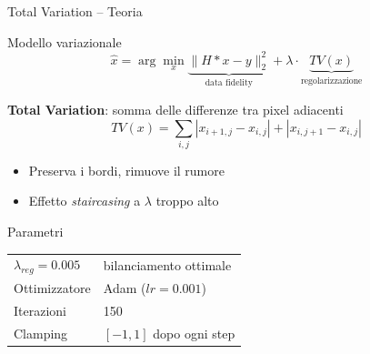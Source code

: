 \documentclass[italian,10pt]{beamer}
\begin{document}
\begin{frame}{Total Variation -- Teoria}
  \begin{block}{Modello variazionale}
    \begin{equation*}
      \hat{x} = \arg\min_x \underbrace{\|H*x - y\|_2^2}_{\text{data fidelity}} + \lambda \cdot \underbrace{TV(x)}_{\text{regolarizzazione}}
    \end{equation*}
  \end{block}
  \vspace{0.2cm}
  \textbf{Total Variation}: somma delle differenze tra pixel adiacenti
  \begin{equation*}
    TV(x) = \sum_{i,j} |x_{i+1,j} - x_{i,j}| + |x_{i,j+1} - x_{i,j}|
  \end{equation*}
  \vspace{0.2cm}
  \begin{itemize}
    \item Preserva i bordi, rimuove il rumore
    \item Effetto \textit{staircasing} a $\lambda$ troppo alto
  \end{itemize}
  \vspace{0.2cm}
  \begin{block}{Parametri}
    \begin{tabular}{ll}
      $\lambda_{reg}=0.005$ & bilanciamento ottimale \\
      Ottimizzatore & Adam ($lr=0.001$) \\
      Iterazioni & 150 \\
      Clamping & $[-1,1]$ dopo ogni step \\
    \end{tabular}
  \end{block}
\end{frame}
\end{document}
